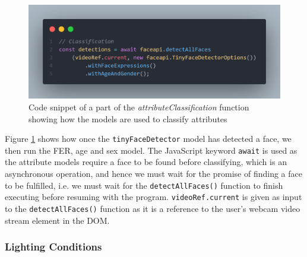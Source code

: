 \documentclass[12pt, a4paper]{article}
\begin{document}
\begin{figure}[H]
    \centering
    \includegraphics[scale=0.3]{images/codeferclassification.png}
    \caption{Code snippet of a part of the \textit{attributeClassification} function showing how the models are used to classify attributes}
    \label{fig:codeferclassification}
\end{figure}

Figure \ref{fig:codeferclassification} shows how once the \verb+tinyFaceDetector+ model has detected a face, we then run the FER, age and sex model. The JavaScript keyword \verb+await+ is used as the attribute models require a face to be found before classifying, which is an asynchronous operation, and hence we must wait for the promise of finding a face to be fulfilled, i.e. we must wait for the \verb+detectAllFaces()+ function to finish executing before resuming with the program. \verb+videoRef.current+ is given as input to the \verb+detectAllFaces()+ function as it is a reference to the user's webcam video stream element in the DOM.


\subsubsection{Lighting Conditions}
\end{document}
